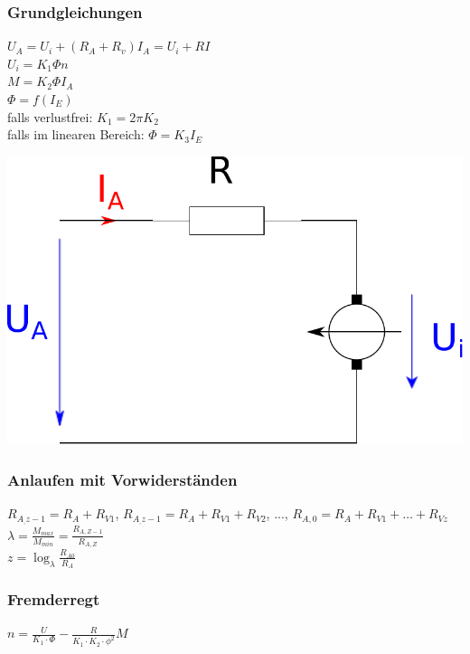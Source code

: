 \documentclass[fs, footer]{latex4ei}
\begin{document}
\begin{multicols}{4}
    \subsubsection{Grundgleichungen}
    $U_A = U_i + (R_A + R_v) I_A = U_i + RI$\\
    $U_i = K_1 \Phi n$\\
    $M = K_2 \Phi I_A$\\
    $\Phi = f(I_E)$\\
    falls verlustfrei: $K_1 = 2 \pi K_2$ \\
    falls im linearen Bereich: $\Phi = K_3 I_E$ \\

    \begin{center}
        \includegraphics[scale=.2]{./img/ersatzschaltbild_gleichstrommaschine.pdf}
    \end{center}

    \subsubsection{Anlaufen mit Vorwiderständen}
    $R_{A_,z-1} = R_A + R_{V1}$, $R_{A_,z-1} = R_A + R_{V1} + R_{V2}$, ..., $R_{A,0} = R_A + R_{V1} + \hdots + R_{Vz}$ \\
    $\lambda = \frac{M_{max}}{M_{min}} = \frac{R_{A,Z-1}}{R_{A,Z}}$ \\
    $ z = \log_\lambda \frac{R_{A0}}{R_A}$


    \subsubsection{Fremderregt}
    $n = \frac{U}{ K_1 \cdot \Phi} - \frac{R}{K_1 \cdot K_2 \cdot \phi^2}M$\\


\end{multicols}
\end{document}
